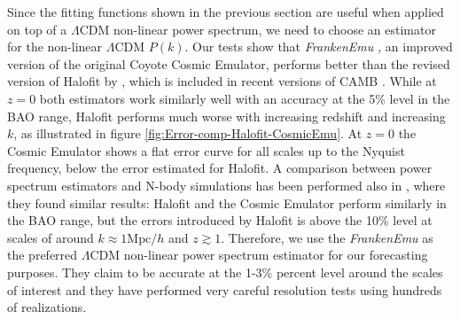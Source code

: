 Since the fitting functions shown in the previous section are useful
when applied on top of a $\Lambda$CDM non-linear power spectrum,
we need to choose an estimator for the non-linear $\Lambda$CDM $P(k)$.
Our tests show that \emph{FrankenEmu }\citep{heitmann_coyote_2014}\emph{,}
an improved version of the original Coyote Cosmic Emulator, performs
better than the revised version of Halofit by \citep{takahashi_revising_2012},
which is included in recent versions of CAMB \citep{lewis_efficient_1999}.
While at $z=0$ both estimators work similarly well with an accuracy
at the 5\% level in the BAO range, Halofit performs much worse with
increasing redshift and increasing $k$, as illustrated in figure
\ref{fig:Error-comp-Halofit-CosmicEmu}. At $z=0$ the Cosmic Emulator
shows a flat error curve for all scales up to the Nyquist frequency,
below the error estimated for Halofit. A comparison between power
spectrum estimators and N-body simulations has been performed also
in \citep{fosalba_mice_2013}, where they found similar results: Halofit
and the Cosmic Emulator perform similarly in the BAO range, but the
errors introduced by Halofit is above the 10\% level at scales of
around $k\approx1\mbox{Mpc}/h$ and $z \gtrsim 1$. Therefore, we use
the \emph{FrankenEmu} as the preferred $\Lambda$CDM non-linear power
spectrum estimator for our forecasting purposes. They claim to be
accurate at the 1-3\% percent level around the scales of interest
and they have performed very careful resolution tests using hundreds
of realizations. 


